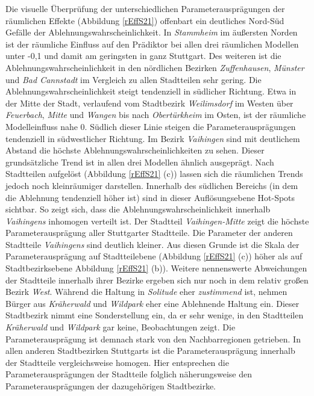 \documentclass{Vorlage}
\begin{document}
Die visuelle Überprüfung der unterschiedlichen Parameterausprägungen der räumlichen Effekte (Abbildung \ref{rEffS21}) offenbart ein deutliches Nord-Süd Gefälle der Ablehnungswahrscheinlichkeit. In \textit{Stammheim} im äußersten Norden ist der räumliche Einfluss auf den Prädiktor bei allen drei räumlichen Modellen unter -0,1 und damit am geringsten in ganz Stuttgart. Des weiteren ist die Ablehnungswahrscheinlichkeit in den nördlichen Bezirken \textit{Zuffenhausen}, \textit{Münster} und \textit{Bad Cannstadt} im Vergleich zu allen Stadtteilen sehr gering. Die Ablehnungswahrscheinlichkeit steigt tendenziell in südlicher Richtung. Etwa in der Mitte der Stadt, verlaufend vom Stadtbezirk \textit{Weilimsdorf} im Westen über \textit{Feuerbach}, \textit{Mitte} und \textit{Wangen} bis nach \textit{Obertürkheim} im Osten, ist der räumliche Modelleinfluss nahe 0. Südlich dieser Linie steigen die Parameterausprägungen tendenziell in südwestlicher Richtung. Im Bezirk \textit{Vaihingen} sind mit deutlichem Abstand die höchste Ablehnungswahrscheinlichkeiten zu sehen. Dieser grundsätzliche Trend ist in allen drei Modellen ähnlich ausgeprägt. Nach Stadtteilen aufgelöst (Abbildung \ref{rEffS21} (c)) lassen sich die räumlichen Trends jedoch noch kleinräumiger darstellen. Innerhalb des südlichen Bereichs (in dem die Ablehnung tendenziell höher ist) sind in dieser Auflösungsebene Hot-Spots sichtbar. So zeigt sich, dass die Ablehnungswahrscheinlichkeit innerhalb \textit{Vaihingens} inhomogen verteilt ist. Der Stadtteil \textit{Vaihingen-Mitte} zeigt die höchste Parameterausprägung aller Stuttgarter Stadtteile. Die Parameter der anderen Stadtteile \textit{Vaihingens} sind deutlich kleiner. Aus diesen Grunde ist die Skala der Parameterausprägung auf Stadtteilebene (Abbildung \ref{rEffS21} (c)) höher als auf Stadtbezirksebene Abbildung \ref{rEffS21} (b)). Weitere nennenswerte Abweichungen der Stadtteile innerhalb ihrer Bezirke ergeben sich nur noch in dem relativ großen Bezirk \textit{West}. Während die Haltung in \textit{Solitude} eher \textit{zustimmend} ist, nehmen Bürger aus \textit{Kräherwald} und \textit{Wildpark} eher eine Ablehnende Haltung ein. Dieser Stadtbezirk nimmt eine Sonderstellung ein, da er sehr wenige, in den Stadtteilen \textit{Kräherwald} und \textit{Wildpark} gar keine, Beobachtungen zeigt. Die Parameterausprägung ist demnach stark von den Nachbarregionen getrieben. In allen anderen Stadtbezirken Stuttgarts ist die Parameterausprägung innerhalb der Stadtteile vergleichsweise homogen. Hier entsprechen die Parameterausprägungen der Stadtteile folglich näherungsweise den Parameterausprägungen der dazugehörigen Stadtbezirke.\\
\end{document}
